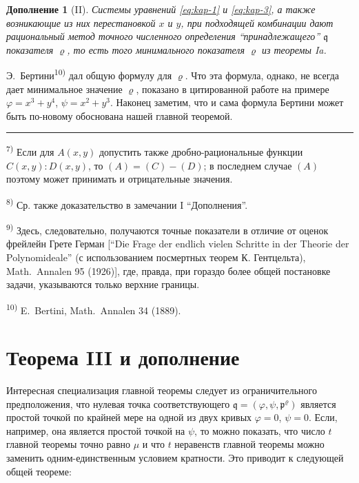 \documentclass[11pt]{article}
\newcommand{\foreign}[1]{#1}
\theoremstyle{plain}
\newtheorem{zusatz}{Дополнение}
\begin{document}
\begin{zusatz}[II]
Системы уравнений \eqref{eq:kap-1} и \eqref{eq:kap-3}, а также
возникающие из них перестановкой $x$ и $y$, при подходящей
комбинации дают рациональный метод точного численного определения
``принадлежащего'' $\mathfrak{q}$ показателя $\varrho$, то есть того
минимального показателя $\varrho$ из теоремы Ia.
\end{zusatz}

Э.\ Бертини\textsuperscript{10)} дал общую формулу для $\varrho$.
Что эта формула, однако, не всегда дает минимальное значение
$\varrho$, показано в цитированной работе на примере
$\varphi = x^{3} + y^{4}$, $\psi = x^{2} + y^{3}$. Наконец заметим,
что и сама формула Бертини может быть по-новому обоснована нашей
главной теоремой.

\vspace{0.5em}
\noindent\rule{\textwidth}{0.4pt}
\vspace{0.3em}

{\footnotesize
\textsuperscript{7)} Если для $A(x,y)$ допустить также дробно-рациональные
функции $C(x,y):D(x,y)$, то $(A) = (C) - (D)$; в последнем случае
$(A)$ поэтому может принимать и отрицательные значения.

\textsuperscript{8)} Ср. также доказательство в замечании I ``Дополнения''.

\textsuperscript{9)} Здесь, следовательно, получаются точные показатели в
отличие от оценок фрейлейн Грете Герман [``Die Frage der endlich vielen Schritte
in der Theorie der Polynomideale'' (с использованием посмертных теорем
К. Гентцельта), \foreign{Math.\ Annalen} 95 (1926)], где, правда, при
гораздо более общей постановке задачи, указываются только верхние границы.

\textsuperscript{10)} E.\ Bertini, \foreign{Math.\ Annalen} 34 (1889).
}

\newpage
\section*{Теорема III и дополнение}

Интересная специализация главной теоремы следует из ограничительного
предположения, что нулевая точка соответствующего
$\mathfrak{q} = (\varphi, \psi, \mathfrak{p}^\varrho)$ является
простой точкой по крайней мере на одной из двух кривых
$\varphi = 0$, $\psi = 0$. Если, например, она является простой
точкой на $\psi$, то можно показать, что число $t$ главной теоремы
точно равно $\mu$ и что $t$ неравенств главной теоремы можно
заменить одним-единственным условием кратности. Это приводит к
следующей общей теореме:
\end{document}
